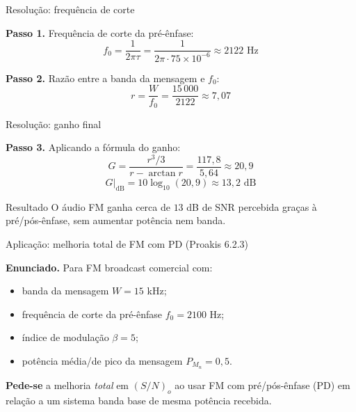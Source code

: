 
\begin{frame}{Resolução: frequência de corte}

\textbf{Passo 1.} Frequência de corte da pré-ênfase:
\[
f_0 = \frac{1}{2\pi \tau} = \frac{1}{2\pi \cdot 75 \times 10^{-6}} \approx 2122 \text{ Hz}
\]

\textbf{Passo 2.} Razão entre a banda da mensagem e $f_0$:
\[
r = \frac{W}{f_0} = \frac{15\,000}{2122} \approx 7{,}07
\]

\end{frame}


\begin{frame}{Resolução: ganho final}

\textbf{Passo 3.} Aplicando a fórmula do ganho:
\[
G = \frac{r^3 / 3}{r - \arctan r} = \frac{117{,}8}{5{,}64} \approx 20{,}9
\]
\[
G\big|_{\text{dB}} = 10\log_{10}(20{,}9) \approx 13{,}2 \text{ dB}
\]

\begin{block}{Resultado}
O áudio FM ganha cerca de $13$ dB de SNR percebida graças à pré/pós-ênfase, sem aumentar potência nem banda.
\end{block}

\end{frame}


\begin{frame}{Aplicação: melhoria total de FM com PD (Proakis 6.2.3)}

\textbf{Enunciado.} Para FM broadcast comercial com:
\begin{itemize}
\item banda da mensagem $W = 15$ kHz;
\item frequência de corte da pré-ênfase $f_0 = 2100$ Hz;
\item índice de modulação $\beta = 5$;
\item potência média/de pico da mensagem $P_{M_n} = 0{,}5$.
\end{itemize}

\textbf{Pede-se} a melhoria \emph{total} em $(S/N)_o$ ao usar FM com pré/pós-ênfase (PD) em relação a um sistema banda base de mesma potência recebida.

\end{frame}


